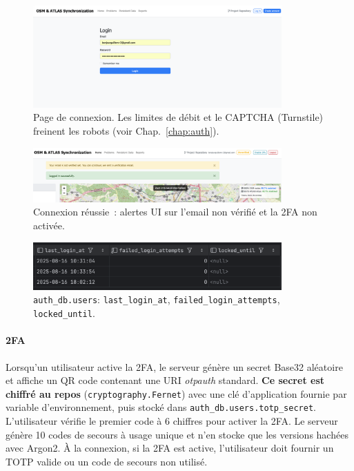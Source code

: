 \begin{figure}[H]
  \centering
  \includegraphics[width=0.85\textwidth]{../figures/chap10/login_page.png}
  \caption{Page de connexion. Les limites de débit et le CAPTCHA (Turnstile) freinent les robots (voir Chap.~\ref{chap:auth}).}
\end{figure}

\begin{figure}[H]
  \centering
  \includegraphics[width=0.85\textwidth]{../figures/chap10/login_succesful.png}
  \caption{Connexion réussie : alertes UI sur l'email non vérifié et la 2FA non activée.}
\end{figure}

\begin{figure}[H]
  \centering
  \includegraphics[width=0.85\textwidth]{../figures/chap10/auth_db4.png}
  \caption{\texttt{auth\_db.users}: \texttt{last\_login\_at}, \texttt{failed\_login\_attempts}, \texttt{locked\_until}.}
\end{figure}

\paragraph{2FA}
Lorsqu'un utilisateur active la 2FA, le serveur génère un secret Base32 aléatoire et affiche un QR code contenant une URI \textit{otpauth} standard. \textbf{Ce secret est chiffré au repos} (\texttt{cryptography.Fernet}) avec une clé d'application fournie par variable d'environnement, puis stocké dans \texttt{auth\_db.users.totp\_secret}. L'utilisateur vérifie le premier code à 6 chiffres pour activer la 2FA. Le serveur génère 10 codes de secours à usage unique et n'en stocke que les versions hachées avec Argon2. À la connexion, si la 2FA est active, l'utilisateur doit fournir un TOTP valide ou un code de secours non utilisé.

